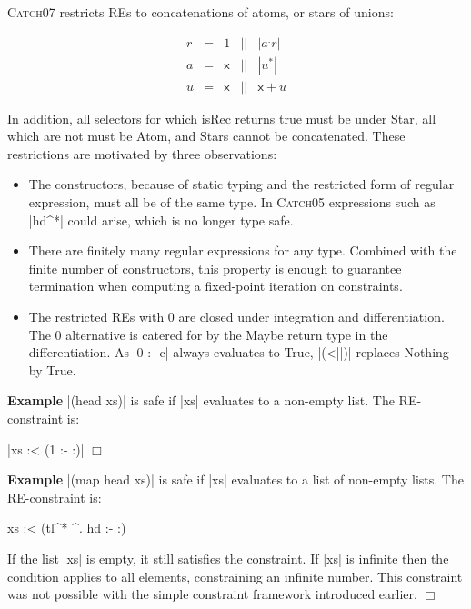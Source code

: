 \documentclass[preprint]{sigplanconf}
\newcommand{\C}[1]{\textsf{#1}}
\newcommand{\catch}{\textsc{Catch}}
\newcounter{exmp}
\newcommand{\yesexample}{\addtocounter{exmp}{1}\addvspace{2mm}\noindent\textbf{Example \arabic{exmp}}}
\newcommand{\noexample}{\hfill$\Box$\par\addvspace{2mm}}
\newenvironment{discuss}
    {\noindent\hspace{-1.5mm}\vline\hspace{1mm}\vline\hspace{1mm}\begin{minipage}[h]{\linewidth}}
    {\end{minipage}}
\newenvironment{example}{\yesexample}{\noexample}
\begin{document}
\catch07 restricts REs to concatenations of atoms, or stars of unions:

\[\begin{array}{lllll}
r & = & 1     & || & |a^.r| \\
a & = & \C{x} & || & |u^*| \\
u & = & \C{x} & || & \C{x} + u
\end{array}\]

In addition, all selectors for which \C{isRec} returns true must be under \C{Star}, all which are not must be \C{Atom}, and \C{Star}s cannot be concatenated. These restrictions are motivated by three observations:

\begin{itemize}
\item \begin{discuss} The constructors, because of static typing and the restricted form of regular expression, must all be of the same type. In \catch05 expressions such as |hd^*| could arise, which is no longer type safe.\end{discuss}

\item There are finitely many regular expressions for any type. Combined with the finite number of constructors, this property is enough to guarantee termination when computing a fixed-point iteration on constraints.

\item The restricted REs with 0 are closed under integration and differentiation. The 0 alternative is catered for by the \C{Maybe} return type in the differentiation. As |0 :- c| always evaluates to True, |(<||)| replaces \C{Nothing} by True.
\end{itemize}

\begin{example}
|(head xs)| is safe if |xs| evaluates to a non-empty list. The RE-constraint is:

\smallskip\noindent |xs :< (1 :- {:})|
\end{example}

\begin{example}
|(map head xs)| is safe if |xs| evaluates to a list of non-empty lists. The RE-constraint is:

\begin{code}
xs :< (tl^* ^. hd :- {:})
\end{code}

If the list |xs| is empty, it still satisfies the constraint. If |xs| is infinite then the condition applies to all elements, constraining an infinite number. This constraint was not possible with the simple constraint framework introduced earlier.
\end{example}
\end{document}
